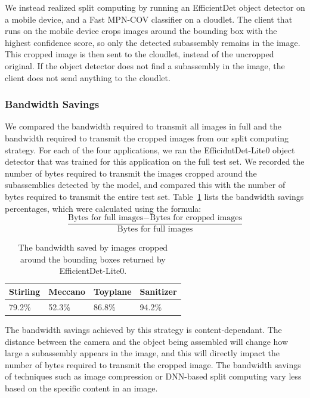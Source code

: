 We instead realized split computing by running an EfficientDet object detector
on a mobile device, and a Fast MPN-COV classifier on a cloudlet.
The client that runs on the mobile device crops images around the bounding box
with the highest confidence score, so only the detected subassembly remains in
the image.
This cropped image is then sent to the cloudlet, instead of the uncropped
original.
If the object detector does not find a subassembly in the image, the client does
not send anything to the cloudlet.

\subsubsection{Bandwidth Savings}

We compared the bandwidth required to transmit all images in full and the
bandwidth required to transmit the cropped images from our split computing
strategy.
For each of the four applications, we ran the EfficidntDet-Lite0 object detector
that was trained for this application on the full test set.
We recorded the number of bytes required to transmit the images cropped around
the subassemblies detected by the model, and compared this with the number of
bytes required to transmit the entire test set.
Table~\ref{tab:bandwidth} lists the bandwidth savings percentages, which were
calculated using the formula:
\[
  \frac{\text{Bytes for full images} - \text{Bytes for cropped images}}{
    \text{Bytes for full images}}
\]

\begin{table}
  \begin{tabular}{|l|l|l|l|}
  \hline
  Stirling & Meccano & Toyplane & Sanitizer\\
  \hline
  \hline
  79.2\% & 52.3\% & 86.8\% & 94.2\%\\
  \hline
\end{tabular}
\caption{
  The bandwidth saved by images cropped around the bounding boxes returned by
  EfficientDet-Lite0.
}\label{tab:bandwidth}
\end{table}

The bandwidth savings achieved by this strategy is content-dependant.
The distance between the camera and the object being assembled will change how
large a subassembly appears in the image, and this will directly impact the
number of bytes required to transmit the cropped image.
The bandwidth savings of techniques such as image compression or DNN-based split
computing vary less based on the specific content in an image.

